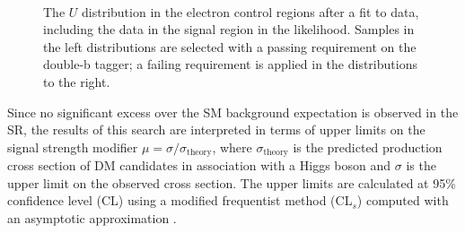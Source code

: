 \begin{figure}
  \\
\caption{The $U$ distribution in the electron control regions after a fit to data, including the data in the signal region in the likelihood. Samples in the left distributions are selected with a passing requirement on the double-b tagger; a failing requirement is applied in the distributions to the right.}
\label{Fig_cr_2}
\end{figure}

Since no significant excess over the SM background expectation is observed in the SR, the results of this search are interpreted in terms of upper limits on the signal strength modifier $\mu=\sigma/\sigma_\text{theory}$, where $\sigma_\text{theory}$ is the predicted production cross 
section of DM candidates in association with a Higgs boson and $\sigma$ is the upper limit on the observed cross section. 
The upper limits are calculated at 95\% confidence level (CL) using a modified frequentist method (CL$_s$) \cite{yellowReport, bib:CLS1, bib:CLS2} computed with an asymptotic approximation \cite{bib:CLS3}. 


